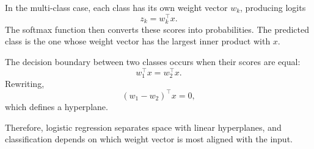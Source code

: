 \medskip

In the multi-class case, each class has its own weight vector $w_k$, producing logits
\[
z_k = w_k^\top x.
\]
The softmax function then converts these scores into probabilities.  
The predicted class is the one whose weight vector has the largest inner product with $x$.

\medskip

The decision boundary between two classes occurs when their scores are equal:
\[
w_1^\top x = w_2^\top x.
\]
Rewriting,
\[
(w_1 - w_2)^\top x = 0,
\]
which defines a hyperplane.  

Therefore, logistic regression separates space with linear hyperplanes, and classification depends on which weight vector is most aligned with the input.



\bigskip

